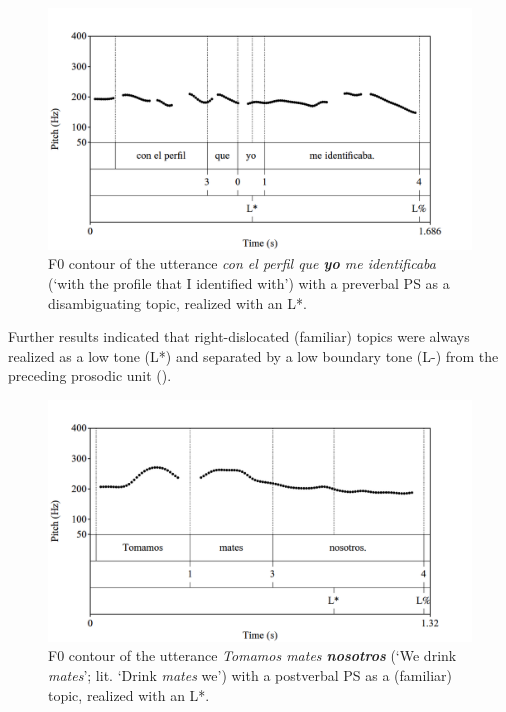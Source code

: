 \documentclass[output=paper]{langsci/langscibook}
\begin{document}
 
 \begin{figure}
\includegraphics[width=\textwidth]{figures/pes-img18.png}
\caption{F0 contour of the utterance \textit{con el perfil que \textbf{yo} me identificaba} (‘with the profile that I identified with’) with a preverbal PS as a disambiguating topic, realized with an L*.\label{fig:pes:18}}
\end{figure}

Further results indicated that right-dislocated (familiar) topics were always realized as a low tone (L*) and separated by a low boundary tone (L-) from the preceding prosodic unit (). 



\begin{figure}
\includegraphics[width=\textwidth]{figures/pes-img19.png}
\caption{F0 contour of the utterance \textit{Tomamos mates \textbf{nosotros}} (‘We drink \textit{mates}’; lit. ‘Drink \textit{mates} we’) with a postverbal PS as a (familiar) topic, realized with an L*.\label{fig:pes:19}}
\end{figure}
\end{document}
